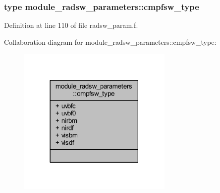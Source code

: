 \subsubsection{type module\+\_\+radsw\+\_\+parameters\+:\+:cmpfsw\+\_\+type}


Definition at line 110 of file radsw\+\_\+param.\+f.



Collaboration diagram for module\+\_\+radsw\+\_\+parameters\+:\+:cmpfsw\+\_\+type\+:\nopagebreak
\begin{figure}[H]
\begin{center}
\leavevmode
\includegraphics[width=213pt]{structmodule__radsw__parameters_1_1cmpfsw__type__coll__graph}
\end{center}
\end{figure}
